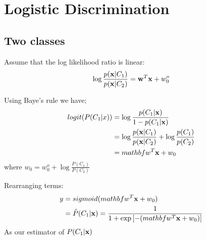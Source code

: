 \section{Logistic Discrimination}
\subsection{Two classes}
     Assume that the log likelihood ratio is linear:
        \[\log\frac{p(\mathbf{x}|C_1)}{p(\mathbf{x}|C_2)} = \mathbf{w}^T\mathbf{x} + w_0^o \]

    Using Baye's rule we have;
        \begin{align*}
            logit(P(C_1|x)) & = \log\frac{p(C_1|\mathbf{x})}{1 - p(C_1|\mathbf{x})} \\
            & = \log\frac{p(\mathbf{x}|C_1)}{p(\mathbf{x}|C_2)} + \log\frac{p(C_1)}{p(C_2)} \\
            & = mathbf{w}^T\mathbf{x} + w_0
        \end{align*}
        where $w_0 = w_0^o + \log\frac{P(C_1)}{P(C_2)}$

       Rearranging terms: 
        \begin{align*} y  & = sigmoid(mathbf{w}^T\mathbf{x} + w_0) \\
            & =  \hat{P}(C_1|\mathbf{x}) = \frac{1}{1 + \exp\left[-(mathbf{w}^T\mathbf{x} + w_0 )\right]}
        \end{align*}
        As our estimator of $P(C_1|\mathbf{x})$

